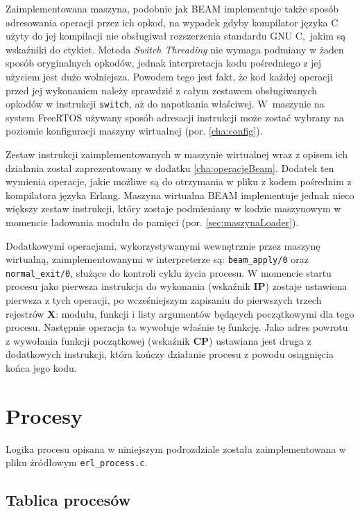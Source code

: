 Zaimplementowana maszyna, podobnie jak BEAM implementuje także sposób adresowania operacji przez ich opkod, na wypadek gdyby kompilator języka C użyty do jej kompilacji nie obsługiwał rozszerzenia standardu GNU C,~jakim są wskaźniki do etykiet.
Metoda \emph{Switch Threading} nie wymaga podmiany w żaden sposób oryginalnych opkodów, jednak interpretacja kodu pośredniego z jej użyciem jest dużo wolniejsza.
Powodem tego jest fakt, że kod każdej operacji przed jej wykonaniem należy sprawdzić z całym zestawem obsługiwanych opkodów w instrukcji \texttt{switch}, aż do napotkania właściwej.
W~maszynie na system FreeRTOS używany sposób adresacji instrukcji może zostać wybrany na poziomie konfiguracji maszyny wirtualnej (por. \ref{cha:config}).

Zestaw instrukcji zaimplementowanych w maszynie wirtualnej wraz z opisem ich działania został zaprezentowany w dodatku \ref{cha:operacjeBeam}.
Dodatek ten wymienia operacje, jakie możliwe są do otrzymania w pliku z kodem pośrednim z kompilatora języka Erlang.
Maszyna wirtualna BEAM implementuje jednak nieco większy zestaw instrukcji, który zostaje podmieniany w kodzie maszynowym w momencie ładowania modułu do pamięci (por. \ref{sec:maszynaLoader}).

Dodatkowymi operacjami, wykorzystywanymi wewnętrznie przez maszynę wirtualną, zaimplementowanymi w interpreterze są: \texttt{beam\_apply/0} oraz \texttt{normal\_exit/0}, służące do kontroli cyklu życia procesu.
W momencie startu procesu jako pierwsza instrukcja do wykonania (wskaźnik \textbf{IP}) zostaje ustawiona pierwsza z tych operacji, po wcześniejszym zapisaniu do pierwszych trzech rejestrów \textbf{X}: modułu, funkcji i listy argumentów będących początkowymi dla tego procesu.
Następnie operacja ta wywołuje właśnie tę funkcję.
Jako adres powrotu z wywołania funkcji początkowej (wskaźnik \textbf{CP}) ustawiana jest druga z dodatkowych instrukcji, która kończy działanie procesu z powodu osiągnięcia końca jego kodu.

\section{Procesy}
\label{sec:maszynaProcesy}

Logika procesu opisana w niniejszym podrozdziale została zaimplementowana w pliku źródłowym \texttt{erl\_process.c}.

\subsection{Tablica procesów}
\label{sub:procTablica}

